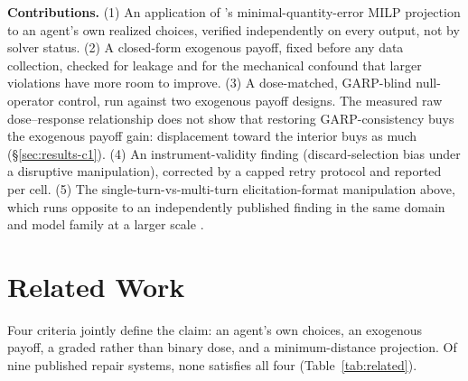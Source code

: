 \documentclass{article}
\begin{document}
\textbf{Contributions.} (1) An application of
\citet{demuynck2023computing}'s minimal-quantity-error MILP projection to an agent's own realized
choices, verified independently on every output, not by solver status. (2)
A closed-form exogenous payoff, fixed before any data collection, checked for leakage and for the
mechanical confound that larger violations have more room to improve. (3) A
dose-matched, GARP-blind null-operator control, run against two exogenous payoff
designs. The measured raw dose--response relationship does not show that
restoring GARP-consistency buys the exogenous payoff gain: displacement toward the interior buys
as much (\S\ref{sec:results-c1}). (4) An instrument-validity finding
(discard-selection bias under a disruptive manipulation), corrected by a capped retry
protocol and reported per cell. (5) The single-turn-vs-multi-turn elicitation-format
manipulation above, which runs opposite to an independently published finding in the same
domain and model family at a larger scale \citep{wang2025tactics}.

\section{Related Work}
\label{sec:related}

Four criteria jointly define the claim: an agent's own choices, an exogenous payoff, a graded
rather than binary dose, and a minimum-distance projection. Of nine published repair systems, none
satisfies all four (Table~\ref{tab:related}).
\end{document}
